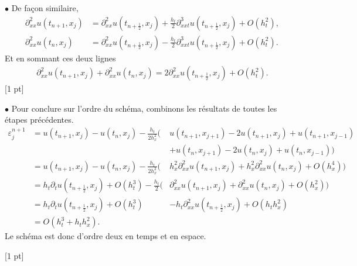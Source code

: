 \documentclass[12pt]{article}
\begin{document}
\begin{cor}
\begin{enumerate}
    $\bullet$ De fa\c{c}on similaire,
    \begin{align*}
      \partial_{xx}^2 u(t_{n+1},x_j)
      &= \partial_{xx}^2 u(t_{n+\frac12},x_j) + \frac{h_t}2 \partial_{xxt}^3 u(t_{n+\frac12},x_j) + O(h_t^2),
      \\
      \partial_{xx}^2 u(t_{n},x_j)
      &= \partial_{xx}^2 u(t_{n+\frac12},x_j) - \frac{h_t}2 \partial_{xxt}^3 u(t_{n+\frac12},x_j) + O(h_t^2).
    \end{align*}
    Et en sommant ces deux lignes
    \begin{align*}
      \partial_{xx}^2 u(t_{n+1},x_j) + \partial_{xx}^2 u(t_{n},x_j)
      = 2 \partial_{xx}^2 u(t_{n+\frac12},x_j) + O(h_t^2) .
    \end{align*}
    [1 pt]

    $\bullet$ Pour conclure sur l'ordre du sch\'ema, combinons les r\'esultats
    de toutes les \'etapes pr\'ec\'edentes.
    \begin{align*}
      \varepsilon_j^{n+1}
      &= u(t_{n+1}, x_j) - u(t_n,x_j) - \frac{h_t}{2 h_x^2}
      \Big(
      & u(t_{n+1}, x_{j+1}) - 2 u(t_{n+1}, x_{j}) + u(t_{n+1}, x_{j-1})
      \\
      &&+ u(t_{n}, x_{j+1}) - 2 u(t_{n}, x_{j}) + u(t_{n}, x_{j-1}) \Big)
      \\
      &= u(t_{n+1}, x_j) - u(t_n,x_j) - \frac{h_t}{2 h_x^2}
        \Big(
        &h_x^2 \partial_{xx}^2 u(t_{n+1},x_j) + h_x^2 \partial_{xx}^2 u(t_{n},x_j)
        + O(h_x^4) \Big)
      \\
      &= h_t \partial_t u(t_{n+\frac12}, x_j) + O(h_t^3)
        - \frac{h_t}2 \Big(
      &\partial_{xx}^2 u(t_{n+1},x_j) + \partial_{xx}^2 u(t_{n},x_j) + O(h_x^2) \Big)
      \\
      &= h_t \partial_t u(t_{n+\frac12}, x_j) + O(h_t^3)
      &- h_t \partial_{xx}^2 u(t_{n+\frac12},x_j) + O(h_t h_x^2)
      \\
      &= O(h_t^3 + h_t h_x^2) .
    \end{align*}
    Le sch\'ema est donc d'ordre deux en temps et en espace.
    
    [1 pt]
  \end{enumerate}
  
\end{cor}
\end{document}
